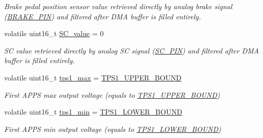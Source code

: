 \begin{DoxyCompactItemize}
\begin{DoxyCompactList}\small\item\em Brake pedal position sensor value retrieved directly by analog brake signal (\mbox{\hyperlink{group___board__model__group_gad632b56bf4c6259a390c3db91607078e}{B\+R\+A\+K\+E\+\_\+\+P\+IN}}) and filtered after D\+MA buffer is filled entirely. \end{DoxyCompactList}\item 
\mbox{\label{group___board__model__group_ga0b4151ed3267a5fae4789f4b3ffe7bbd}} 
volatile uint16\+\_\+t \mbox{\hyperlink{group___board__model__group_ga0b4151ed3267a5fae4789f4b3ffe7bbd}{S\+C\+\_\+value}} = 0
\begin{DoxyCompactList}\small\item\em SC value retrieved directly by analog SC signal (\mbox{\hyperlink{group___board__model__group_gabbdb157ae4ad39d102935c21fa30d1c5}{S\+C\+\_\+\+P\+IN}}) and filtered after D\+MA buffer is filled entirely. \end{DoxyCompactList}\item 
\mbox{\label{group___board__model__group_gaf1d46fb483b2a63c3da25c11688af7c4}} 
volatile uint16\+\_\+t \mbox{\hyperlink{group___board__model__group_gaf1d46fb483b2a63c3da25c11688af7c4}{tps1\+\_\+max}} = \mbox{\hyperlink{group___board__model__group_ga6741cba3daf129b6f73eed1b1db09519}{T\+P\+S1\+\_\+\+U\+P\+P\+E\+R\+\_\+\+B\+O\+U\+ND}}
\begin{DoxyCompactList}\small\item\em First A\+P\+PS max output voltage (equals to \mbox{\hyperlink{group___board__model__group_ga6741cba3daf129b6f73eed1b1db09519}{T\+P\+S1\+\_\+\+U\+P\+P\+E\+R\+\_\+\+B\+O\+U\+ND}}) \end{DoxyCompactList}\item 
\mbox{\label{group___board__model__group_gab7d6ace1f9174e39ed6abbe4aaceb7f4}} 
volatile uint16\+\_\+t \mbox{\hyperlink{group___board__model__group_gab7d6ace1f9174e39ed6abbe4aaceb7f4}{tps1\+\_\+min}} = \mbox{\hyperlink{group___board__model__group_ga9c9aa914f6b372d9ef3f15ce4108da6a}{T\+P\+S1\+\_\+\+L\+O\+W\+E\+R\+\_\+\+B\+O\+U\+ND}}
\begin{DoxyCompactList}\small\item\em First A\+P\+PS min output voltage (equals to \mbox{\hyperlink{group___board__model__group_ga9c9aa914f6b372d9ef3f15ce4108da6a}{T\+P\+S1\+\_\+\+L\+O\+W\+E\+R\+\_\+\+B\+O\+U\+ND}}) \end{DoxyCompactList}\item 

\end{DoxyCompactItemize}
